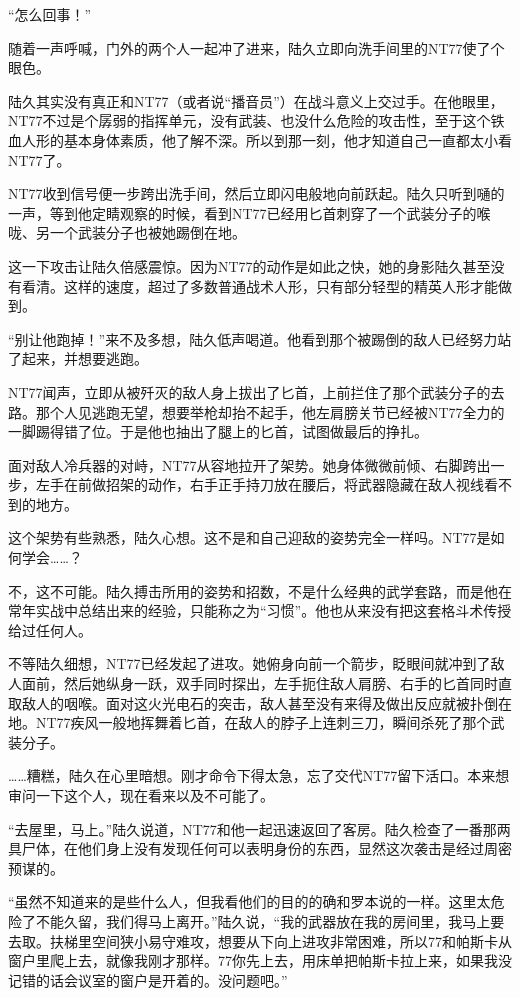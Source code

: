 “怎么回事！”

随着一声呼喊，门外的两个人一起冲了进来，陆久立即向洗手间里的NT77使了个眼色。

陆久其实没有真正和NT77（或者说“播音员”）在战斗意义上交过手。在他眼里，NT77不过是个孱弱的指挥单元，没有武装、也没什么危险的攻击性，至于这个铁血人形的基本身体素质，他了解不深。所以到那一刻，他才知道自己一直都太小看NT77了。

NT77收到信号便一步跨出洗手间，然后立即闪电般地向前跃起。陆久只听到嗵的一声，等到他定睛观察的时候，看到NT77已经用匕首刺穿了一个武装分子的喉咙、另一个武装分子也被她踢倒在地。

这一下攻击让陆久倍感震惊。因为NT77的动作是如此之快，她的身影陆久甚至没有看清。这样的速度，超过了多数普通战术人形，只有部分轻型的精英人形才能做到。

“别让他跑掉！”来不及多想，陆久低声喝道。他看到那个被踢倒的敌人已经努力站了起来，并想要逃跑。

NT77闻声，立即从被歼灭的敌人身上拔出了匕首，上前拦住了那个武装分子的去路。那个人见逃跑无望，想要举枪却抬不起手，他左肩膀关节已经被NT77全力的一脚踢得错了位。于是他也抽出了腿上的匕首，试图做最后的挣扎。

面对敌人冷兵器的对峙，NT77从容地拉开了架势。她身体微微前倾、右脚跨出一步，左手在前做招架的动作，右手正手持刀放在腰后，将武器隐藏在敌人视线看不到的地方。

这个架势有些熟悉，陆久心想。这不是和自己迎敌的姿势完全一样吗。NT77是如何学会……？

不，这不可能。陆久搏击所用的姿势和招数，不是什么经典的武学套路，而是他在常年实战中总结出来的经验，只能称之为“习惯”。他也从来没有把这套格斗术传授给过任何人。

不等陆久细想，NT77已经发起了进攻。她俯身向前一个箭步，眨眼间就冲到了敌人面前，然后她纵身一跃，双手同时探出，左手扼住敌人肩膀、右手的匕首同时直取敌人的咽喉。面对这火光电石的突击，敌人甚至没有来得及做出反应就被扑倒在地。NT77疾风一般地挥舞着匕首，在敌人的脖子上连刺三刀，瞬间杀死了那个武装分子。

……糟糕，陆久在心里暗想。刚才命令下得太急，忘了交代NT77留下活口。本来想审问一下这个人，现在看来以及不可能了。

“去屋里，马上。”陆久说道，NT77和他一起迅速返回了客房。陆久检查了一番那两具尸体，在他们身上没有发现任何可以表明身份的东西，显然这次袭击是经过周密预谋的。

“虽然不知道来的是些什么人，但我看他们的目的的确和罗本说的一样。这里太危险了不能久留，我们得马上离开。”陆久说，“我的武器放在我的房间里，我马上要去取。扶梯里空间狭小易守难攻，想要从下向上进攻非常困难，所以77和帕斯卡从窗户里爬上去，就像我刚才那样。77你先上去，用床单把帕斯卡拉上来，如果我没记错的话会议室的窗户是开着的。没问题吧。”

